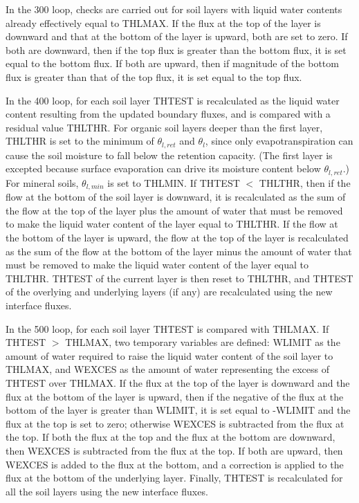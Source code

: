 In the 300 loop, checks are carried out for soil layers with liquid water contents already effectively equal to T\+H\+L\+M\+A\+X. If the flux at the top of the layer is downward and that at the bottom of the layer is upward, both are set to zero. If both are downward, then if the top flux is greater than the bottom flux, it is set equal to the bottom flux. If both are upward, then if magnitude of the bottom flux is greater than that of the top flux, it is set equal to the top flux.

In the 400 loop, for each soil layer T\+H\+T\+E\+S\+T is recalculated as the liquid water content resulting from the updated boundary fluxes, and is compared with a residual value T\+H\+L\+T\+H\+R. For organic soil layers deeper than the first layer, T\+H\+L\+T\+H\+R is set to the minimum of $\theta_{l,ret}$ and $\theta_l$, since only evapotranspiration can cause the soil moisture to fall below the retention capacity. (The first layer is excepted because surface evaporation can drive its moisture content below $\theta_{l,ret}$.) For mineral soils, $\theta_{l,min}$ is set to T\+H\+L\+M\+I\+N. If T\+H\+T\+E\+S\+T $<$ T\+H\+L\+T\+H\+R, then if the flow at the bottom of the soil layer is downward, it is recalculated as the sum of the flow at the top of the layer plus the amount of water that must be removed to make the liquid water content of the layer equal to T\+H\+L\+T\+H\+R. If the flow at the bottom of the layer is upward, the flow at the top of the layer is recalculated as the sum of the flow at the bottom of the layer minus the amount of water that must be removed to make the liquid water content of the layer equal to T\+H\+L\+T\+H\+R. T\+H\+T\+E\+S\+T of the current layer is then reset to T\+H\+L\+T\+H\+R, and T\+H\+T\+E\+S\+T of the overlying and underlying layers (if any) are recalculated using the new interface fluxes.

In the 500 loop, for each soil layer T\+H\+T\+E\+S\+T is compared with T\+H\+L\+M\+A\+X. If T\+H\+T\+E\+S\+T $>$ T\+H\+L\+M\+A\+X, two temporary variables are defined\+: W\+L\+I\+M\+I\+T as the amount of water required to raise the liquid water content of the soil layer to T\+H\+L\+M\+A\+X, and W\+E\+X\+C\+E\+S as the amount of water representing the excess of T\+H\+T\+E\+S\+T over T\+H\+L\+M\+A\+X. If the flux at the top of the layer is downward and the flux at the bottom of the layer is upward, then if the negative of the flux at the bottom of the layer is greater than W\+L\+I\+M\+I\+T, it is set equal to -\/\+W\+L\+I\+M\+I\+T and the flux at the top is set to zero; otherwise W\+E\+X\+C\+E\+S is subtracted from the flux at the top. If both the flux at the top and the flux at the bottom are downward, then W\+E\+X\+C\+E\+S is subtracted from the flux at the top. If both are upward, then W\+E\+X\+C\+E\+S is added to the flux at the bottom, and a correction is applied to the flux at the bottom of the underlying layer. Finally, T\+H\+T\+E\+S\+T is recalculated for all the soil layers using the new interface fluxes.

